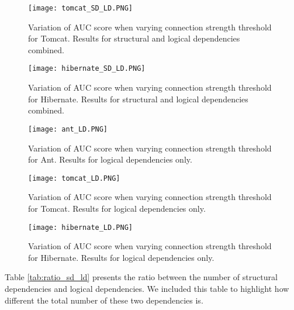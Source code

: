 \begin{figure}
\centering
\texttt{[image: tomcat\_SD\_LD.PNG]}
\caption{Variation of AUC score when varying connection strength threshold for Tomcat. Results for structural and logical dependencies combined. }
\label{fig:plot_sd_ld_tomcat}
\centering
\end{figure}


\begin{figure}
\centering
\texttt{[image: hibernate\_SD\_LD.PNG]}
\caption{Variation of AUC score when varying connection strength threshold for Hibernate. Results for structural and logical dependencies combined. }
\label{fig:plot_sd_ld_hibernate}
\centering
\end{figure}



\begin{figure}
\centering
\texttt{[image: ant\_LD.PNG]}
\caption{Variation of AUC score when varying connection strength threshold for Ant. Results for logical dependencies only. }
\label{fig:plot_ld_ant}
\centering
\end{figure}


\begin{figure}
\centering
\texttt{[image: tomcat\_LD.PNG]}
\caption{Variation of AUC score when varying connection strength threshold for Tomcat. Results for logical dependencies only. }
\label{fig:plot_ld_tomcat}
\centering
\end{figure}


\begin{figure}
\centering
\texttt{[image: hibernate\_LD.PNG]}
\caption{Variation of AUC score when varying connection strength threshold for Hibernate. Results for logical dependencies only.}
\label{fig:plot_ld_hibernate}
\centering
\end{figure}



Table \ref{tab:ratio_sd_ld} presents the ratio between the number of structural dependencies and logical dependencies. We included this table to highlight how different the total number of these two dependencies is.

